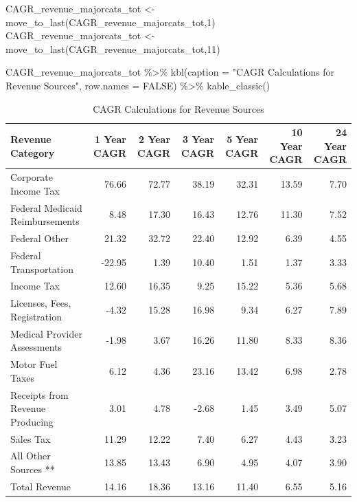 \documentclass[
  letterpaper,
  DIV=11,
  numbers=noendperiod]{scrreport}
\newenvironment{Shaded}{\begin{snugshade}}{\end{snugshade}}
\newcommand{\AttributeTok}[1]{\textcolor[rgb]{0.40,0.45,0.13}{#1}}
\newcommand{\ConstantTok}[1]{\textcolor[rgb]{0.56,0.35,0.01}{#1}}
\newcommand{\DecValTok}[1]{\textcolor[rgb]{0.68,0.00,0.00}{#1}}
\newcommand{\FunctionTok}[1]{\textcolor[rgb]{0.28,0.35,0.67}{#1}}
\newcommand{\NormalTok}[1]{\textcolor[rgb]{0.00,0.23,0.31}{#1}}
\newcommand{\OtherTok}[1]{\textcolor[rgb]{0.00,0.23,0.31}{#1}}
\newcommand{\SpecialCharTok}[1]{\textcolor[rgb]{0.37,0.37,0.37}{#1}}
\newcommand{\StringTok}[1]{\textcolor[rgb]{0.13,0.47,0.30}{#1}}
\begin{document}
\begin{Shaded}
\begin{Highlighting}[]
\NormalTok{CAGR\_revenue\_majorcats\_tot }\OtherTok{\textless{}{-}} \FunctionTok{move\_to\_last}\NormalTok{(CAGR\_revenue\_majorcats\_tot,}\DecValTok{1}\NormalTok{)}
\NormalTok{CAGR\_revenue\_majorcats\_tot }\OtherTok{\textless{}{-}} \FunctionTok{move\_to\_last}\NormalTok{(CAGR\_revenue\_majorcats\_tot,}\DecValTok{11}\NormalTok{)}

\NormalTok{CAGR\_revenue\_majorcats\_tot }\SpecialCharTok{\%\textgreater{}\%} 
  \FunctionTok{kbl}\NormalTok{(}\AttributeTok{caption =} \StringTok{"CAGR Calculations for Revenue Sources"}\NormalTok{, }\AttributeTok{row.names =} \ConstantTok{FALSE}\NormalTok{) }\SpecialCharTok{\%\textgreater{}\%} 
     \FunctionTok{kable\_classic}\NormalTok{() }
\end{Highlighting}
\end{Shaded}

\begin{table}

\caption{CAGR Calculations for Revenue Sources}
\centering
\begin{tabular}[t]{l|r|r|r|r|r|r}
\hline
Revenue Category & 1 Year CAGR & 2 Year CAGR & 3 Year CAGR & 5 Year CAGR & 10 Year CAGR & 24 Year CAGR\\
\hline
Corporate Income Tax & 76.66 & 72.77 & 38.19 & 32.31 & 13.59 & 7.70\\
\hline
Federal Medicaid Reimbursements & 8.48 & 17.30 & 16.43 & 12.76 & 11.30 & 7.52\\
\hline
Federal Other & 21.32 & 32.72 & 22.40 & 12.92 & 6.39 & 4.55\\
\hline
Federal Transportation & -22.95 & 1.39 & 10.40 & 1.51 & 1.37 & 3.33\\
\hline
Income Tax & 12.60 & 16.35 & 9.25 & 15.22 & 5.36 & 5.68\\
\hline
Licenses, Fees, Registration & -4.32 & 15.28 & 16.98 & 9.34 & 6.27 & 7.89\\
\hline
Medical Provider Assessments & -1.98 & 3.67 & 16.26 & 11.80 & 8.33 & 8.36\\
\hline
Motor Fuel Taxes & 6.12 & 4.36 & 23.16 & 13.42 & 6.98 & 2.78\\
\hline
Receipts from Revenue Producing & 3.01 & 4.78 & -2.68 & 1.45 & 3.49 & 5.07\\
\hline
Sales Tax & 11.29 & 12.22 & 7.40 & 6.27 & 4.43 & 3.23\\
\hline
All Other Sources ** & 13.85 & 13.43 & 6.90 & 4.95 & 4.07 & 3.90\\
\hline
Total Revenue & 14.16 & 18.36 & 13.16 & 11.40 & 6.55 & 5.16\\
\hline
\end{tabular}
\end{table}
\end{document}
